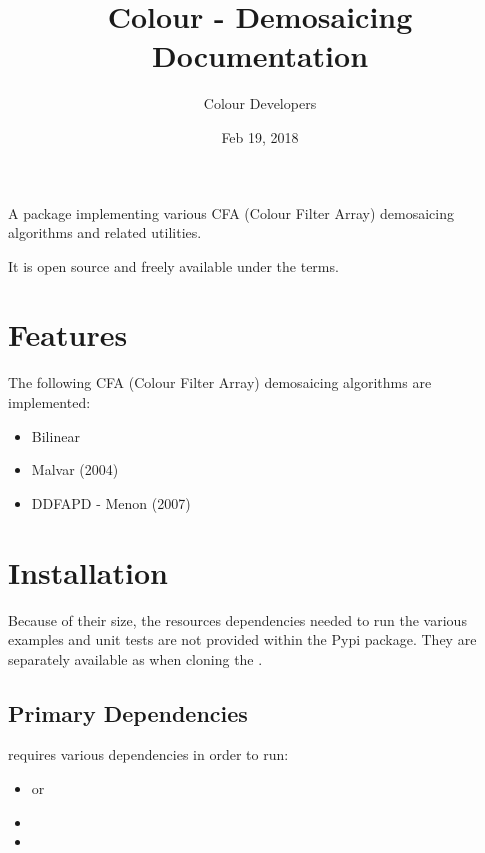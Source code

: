 \documentclass[letterpaper,10pt,english]{sphinxmanual}
\title{Colour - Demosaicing Documentation}
\date{Feb 19, 2018}
\author{Colour Developers}
\begin{document}
\maketitle
\sphinxtableofcontents
{}\label{\detokenize{index::doc}}


\noindent{}

A  package implementing various
CFA (Colour Filter Array) demosaicing algorithms and related utilities.

It is open source and freely available under the
 terms.


\chapter{Features}
\label{\detokenize{index:colour-demosaicing}}\label{\detokenize{index:features}}
The following CFA (Colour Filter Array) demosaicing algorithms are implemented:
\begin{itemize}
\item {} 
Bilinear

\item {} 
Malvar (2004)

\item {} 
DDFAPD - Menon (2007)

\end{itemize}


\chapter{Installation}
\label{\detokenize{index:installation}}
Because of their size, the resources dependencies needed to run the various
examples and unit tests are not provided within the Pypi package. They are
separately available as
when cloning the
.


\section{Primary Dependencies}
\label{\detokenize{index:primary-dependencies}}
 requires various dependencies in order to run:
\begin{itemize}
\item {} 
 or

\item {} 

\item {} 

\end{itemize}
\end{document}
